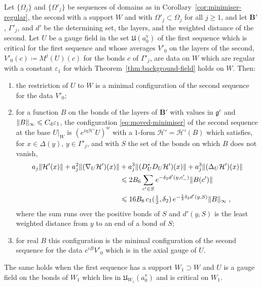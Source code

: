 \documentclass[11pt]{preprint}
\DeclarePairedDelimiter{\norm}{\lVert}{\rVert}
\numberwithin{equation}{section}
\begin{document}
\begin{proposition}\label{prop:comparison}
Let $\{ \Omega_j \}$ and $\{ \Omega'_j \}$ be sequences of domains as in Corollary~\ref{cor:minimiser-regular}, the second with a support $W$ and with $\Omega'_j \subset \Omega_j$ for all $j \geqslant 1$, and let $\mathbf B'$, $\Gamma'_j$, and $d'$ be the determining set, the layers, and the weighted distance of the second. Let $U$ be a gauge field in the set $\mathfrak U(a^{\mathrm v}_0)$ of the first sequence which is critical for the first sequence and whose averages $V'_0$ on the layers of the second, $V'_0(c) \coloneqq M^j(U)(c)$ for the bonds $c$ of $\Gamma'_j$, are data on $W$ which are regular with a constant $\varepsilon_1$ for which Theorem~\ref{thm:background-field} holds on $W$. Then:
\begin{enumerate}[label=(\roman*)]
\item the restriction of $U$ to $W$ is a minimal configuration of the second sequence for the data $V'_0$;
\item for a function $B$ on the bonds of the layers of $\mathbf B'$ with values in $\mathfrak g^c$ and $\norm B_\infty \leqslant C_{\mathrm d}\varepsilon_1$, the configuration \eqref{eq:moved-minimiser} of the second sequence at the base $U|_W$ is $(e^{i\eta\mathcal H'}U)^{w}$ with a $1$-form $\mathcal H' = \mathcal H'(B)$ which satisfies, for $x \in \Delta(y)$, $y \in \Gamma'_j$, and with $S$ the set of the bonds on which $B$ does not vanish,
\begin{equation}\label{eq:comparison}
\begin{aligned}
    a_j\norm{\mathcal H'(x)} + a_j^2\norm{(\nabla_U\mathcal H')(x)} &+ a_j^3\norm{(D^*_UD_U\mathcal H')(x)} + a_j^3\norm{(\Delta_U\mathcal H')(x)}\\
    &\leqslant 2B_6\sum_{c' \in S}e^{-\delta_2d'(y, c'_-)}\norm{B(c')}\\
    &\leqslant 16B_6\,c_1(\tfrac{1}{2}, \delta_2)\,e^{-\frac{1}{2}\delta_2d'(y, S)}\norm B_\infty\;,
\end{aligned}
\end{equation}
where the sum runs over the positive bonds of $S$ and $d'(y, S)$ is the least weighted distance from $y$ to an end of a bond of $S$;
\item for real $B$ this configuration is the minimal configuration of the second sequence for the data $e^{iB}V'_0$ which is in the axial gauge of $U$.
\end{enumerate}
The same holds when the first sequence has a support $W_1 \supset W$ and $U$ is a gauge field on the bonds of $W_1$ which lies in $\mathfrak U_{W_1}(a^{\mathrm v}_0)$ and is critical on $W_1$.
\end{proposition}
\end{document}
